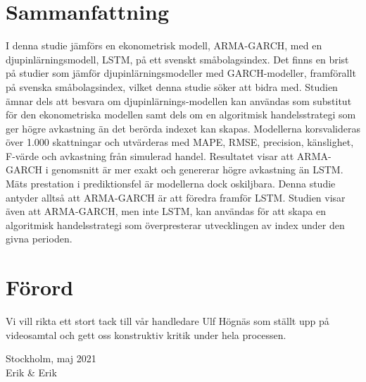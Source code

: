 \documentclass[11pt]{article}
\numberwithin{equation}{section}
\numberwithin{table}{section}
\numberwithin{figure}{section}
\begin{document}
\section*{Sammanfattning}
I denna studie jämförs en ekonometrisk modell, ARMA-GARCH, med en djupinlärningsmodell, LSTM, på ett svenskt småbolagsindex. Det finns en brist på studier som jämför djupinlärningsmodeller med GARCH-modeller, framförallt på svenska småbolagsindex, vilket denna studie söker att bidra med. Studien ämnar dels att besvara om djupinlärnings-modellen kan användas som substitut för den ekonometriska modellen samt dels om en algoritmisk handelsstrategi som ger högre avkastning än det berörda indexet kan skapas. Modellerna korsvalideras över 1.000 skattningar och utvärderas med MAPE, RMSE, precision, känslighet, F-värde och avkastning från simulerad handel. Resultatet visar att ARMA-GARCH i genomsnitt är mer exakt och genererar högre avkastning än LSTM. Mäts prestation i prediktionsfel är modellerna dock oskiljbara. Denna studie antyder alltså att ARMA-GARCH är att föredra framför LSTM. Studien visar även att ARMA-GARCH, men inte LSTM, kan användas för att skapa en algoritmisk handelsstrategi som överpresterar utvecklingen av index under den givna perioden. 

\newpage
\section*{Förord}
Vi vill rikta ett stort tack till vår handledare Ulf Högnäs som ställt upp på
videosamtal och gett oss konstruktiv kritik under hela processen. \bigbreak

Stockholm, maj 2021 \\
Erik \& Erik
\null
\newpage

\newpage
\thispagestyle{empty}
    \tableofcontents
\thispagestyle{empty}
\newpage

\newpage 
\thispagestyle{empty}
\end{document}
